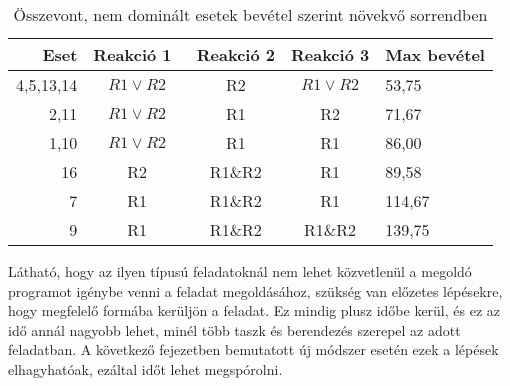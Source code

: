 \begin{table}[H]
	\begin{center}
		\caption{Összevont, nem dominált esetek bevétel szerint növekvő sorrendben}
		\captionsetup[table]{skip=10pt}	
		\label{tabla3}	
		\begin{tabular}{r|ccc|l}
		Eset      & Reakció 1~ & Reakció 2 & Reakció 3 & Max bevétel  \\ 
		\hline
		4,5,13,14 & $R1 \vee R2$      & R2 & $R1 \vee R2$     & 53,75        \\
		2,11      & $R1 \vee R2$      & R1        & R2        & 71,67        \\
		1,10      & $R1 \vee R2$      & R1        & R1        & 86,00        \\
		16        & R2         & R1\&R2    & R1        & 89,58        \\
		7         & R1         & R1\&R2    & R1        & 114,67       \\
		9         & R1         & R1\&R2    & R1\&R2    & 139,75      
		\end{tabular}
	\end{center}
\end{table}

Látható, hogy az ilyen típusú feladatoknál nem lehet közvetlenül a megoldó programot igénybe venni a feladat megoldásához, szükség van előzetes lépésekre, hogy megfelelő formába kerüljön a feladat. Ez mindig plusz időbe kerül, és ez az idő annál nagyobb lehet, minél több taszk és berendezés szerepel az adott feladatban. A következő fejezetben bemutatott új módszer esetén ezek a lépések elhagyhatóak, ezáltal időt lehet megspórolni.




